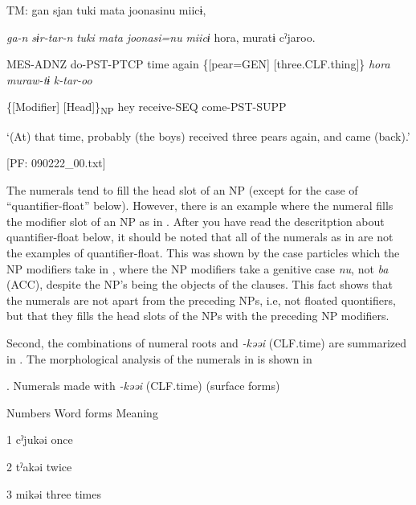     TM:  gan  sjan  tuki  mata  joonasinu  miicɨ,

      \textit{ga-n}  \textit{sɨr-tar-n}  \textit{tuki}  \textit{mata}  \textit{joonasi=nu}  \textit{miicɨ} {\textbar}hora{\textbar},  muratɨ  cˀjaroo.
                                                                                                          
      MES-ADNZ  do-PST-PTCP  time  again  \{[pear=GEN]  [three.CLF.thing]\}    \textit{hora}  \textit{muraw-tɨ}  \textit{k-tar-oo}
                                                                                                          
              \{[Modifier]  [Head]\}\textsubscript{NP}    hey  receive-SEQ  come-PST-SUPP

      ‘(At) that time, probably (the boys) received three pears again, and came (back).’

      [PF: 090222\_00.txt]
    \z
\z

The numerals tend to fill the head slot of an NP (except for the case of “quantifier-float” below). However, there is an example where the numeral fills the modifier slot of an NP as in . After you have read the descritption about quantifier-float below, it should be noted that all of the numerals as in  are not the examples of quantifier-float. This was shown by the case particles which the NP modifiers take in , where the NP modifiers take a genitive case \textit{nu}, not \textit{ba} (ACC), despite the NP’s being the objects of the clauses. This fact shows that the numerals are not apart from the preceding NPs, i.e, not floated quontifiers, but that they fills the head slots of the NPs with the preceding NP modifiers.

Second, the combinations of numeral roots and \textit{{}-kəəi} (CLF.time) are summarized in . The morphological analysis of the numerals in  is shown in 

\begin{styleBeschriftung}
\textmd{}\textmd{. Numerals made with}\textmd{ \textit{-kəəi}}\textmd{ (CLF.time) (surface forms)}
\end{styleBeschriftung}

Numbers  Word forms  Meaning

1  cˀjukəi  once

2  tˀakəi  twice

3  mikəi  three times

